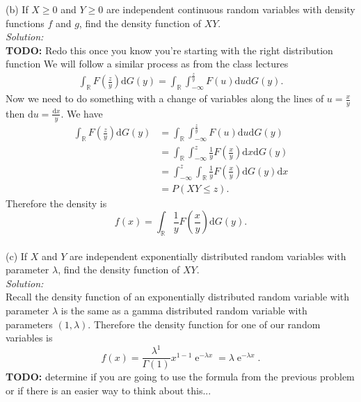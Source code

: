 \documentclass[10pt]{amsart}
\newcommand{\D}{\mathrm{d}}
\DeclareMathOperator{\E}{e}
\begin{document}
(b) If $X \geq 0$ and $Y \geq 0$ are independent continuous random variables with density functions $f$ and $g$, find the density function of $XY$. \\
\textit{Solution:} \\
\textbf{TODO:} Redo this once you know you're starting with the right distribution function
We will follow a similar process as from the class lectures
\begin{align*}
\int_{\mathbb R} F\left(\frac z y \right) \D G(y) = \int_{\mathbb R} \int_{-\infty}^{\frac z y} F\left(u \right) \D u \D G(y).
\end{align*}
Now we need to do something with a change of variables along the lines of $u = \frac x y$ then $\D u = \frac{\D x}{y}$. We have
\begin{align*}
\int_{\mathbb R} F\left(\frac z y \right) \D G(y)
	&= \int_{\mathbb R} \int_{-\infty}^{\frac z y} F\left(u \right) \D u \D G(y) \\
	&= \int_{\mathbb R} \int_{-\infty}^z \frac {1}{y}F\left(\frac x y \right) \D x \D G(y) \\
	&= \int_{-\infty}^z \int_{\mathbb R} \frac {1}{y}F\left(\frac x y \right) \D G(y)\D x \\
	&= P\left( XY \leq z \right).
\end{align*}
Therefore the density is
$$
f(x) = \int_{\mathbb R} \frac {1}{y}F\left(\frac x y \right) \D G(y).
$$
\\

(c) If $X$ and $Y$ are independent exponentially distributed random variables with parameter $\lambda$, find the density function of $XY$.\\
\textit{Solution:} \\
Recall the density function of an exponentially distributed random variable with parameter $\lambda$ is the same as a gamma distributed random variable with parameters $(1, \lambda)$.
Therefore the density function for one of our random variables is
$$
f(x) = \frac {\lambda^1} {\Gamma(1)} x^{1 - 1} \E^{-\lambda x} = \lambda \E^{-\lambda x}.
$$
\textbf{TODO:} determine if you are going to use the formula from the previous problem or if there is an easier way to think about this...
\\
\end{document}
